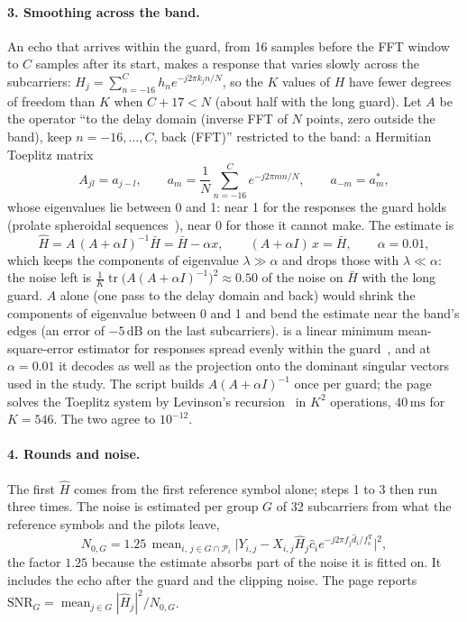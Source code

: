 \documentclass[11pt,a4paper]{article}
\newcommand{\ms}{\,\mathrm{ms}}
\newcommand{\dB}{\,\mathrm{dB}}
\newcommand{\fsT}{f_{\mathrm{s}}^{\mathrm{T}}}
\theoremstyle{remark}
\begin{document}
\paragraph{3. Smoothing across the band.}
An echo that arrives within the guard, from 16 samples before the FFT window to $C$ samples after its start, makes a response that varies slowly across the subcarriers: $H_j = \sum_{n=-16}^{C} h_n e^{-j2\pi k_j n/N}$, so the $K$ values of $H$ have fewer degrees of freedom than $K$ when $C + 17 < N$ (about half with the long guard). Let $A$ be the operator ``to the delay domain (inverse FFT of $N$ points, zero outside the band), keep $n = -16, \dots, C$, back (FFT)'' restricted to the band: a Hermitian Toeplitz matrix
\begin{equation}
A_{jl} = a_{j-l}, \qquad a_m = \frac1N \sum_{n=-16}^{C} e^{-j2\pi m n/N}, \qquad a_{-m} = a_m^*,
\end{equation}
whose eigenvalues lie between 0 and 1: near 1 for the responses the guard holds (prolate spheroidal sequences~\cite{edfors}), near 0 for those it cannot make. The estimate is
\begin{equation}
\hat H = A\,(A + \alpha I)^{-1} \bar H = \bar H - \alpha x, \qquad (A + \alpha I)\,x = \bar H, \qquad \alpha = 0.01,
\label{eq:cohsmooth}
\end{equation}
which keeps the components of eigenvalue $\lambda \gg \alpha$ and drops those with $\lambda \ll \alpha$: the noise left is $\tfrac1K \operatorname{tr}\bigl(A(A+\alpha I)^{-1}\bigr)^2 \approx 0.50$ of the noise on $\bar H$ with the long guard. $A$ alone (one pass to the delay domain and back) would shrink the components of eigenvalue between 0 and 1 and bend the estimate near the band's edges (an error of $-5\dB$ on the last subcarriers).  is a linear minimum mean-square-error estimator for responses spread evenly within the guard~\cite{vandebeek}, and at $\alpha = 0.01$ it decodes as well as the projection onto the dominant singular vectors~\cite{edfors} used in the study. The script builds $A(A + \alpha I)^{-1}$ once per guard; the page solves the Toeplitz system by Levinson's recursion~\cite{levinson} in $K^2$ operations, $40\ms$ for $K = 546$. The two agree to $10^{-12}$.

\paragraph{4. Rounds and noise.}
The first $\hat H$ comes from the first reference symbol alone; steps 1 to 3 then run three times. The noise is estimated per group $G$ of 32 subcarriers from what the reference symbols and the pilots leave,
\begin{equation}
N_{0,G} = 1.25\, \operatorname{mean}_{i,\, j \in G \cap \mathcal P_i} \bigl|Y_{i,j} - X_{i,j} \hat H_j \hat c_i e^{-j2\pi f_j \hat d_i/\fsT}\bigr|^2,
\end{equation}
the factor $1.25$ because the estimate absorbs part of the noise it is fitted on. It includes the echo after the guard and the clipping noise. The page reports $\mathrm{SNR}_G = \operatorname{mean}_{j \in G} |\hat H_j|^2 / N_{0,G}$.
\end{document}
